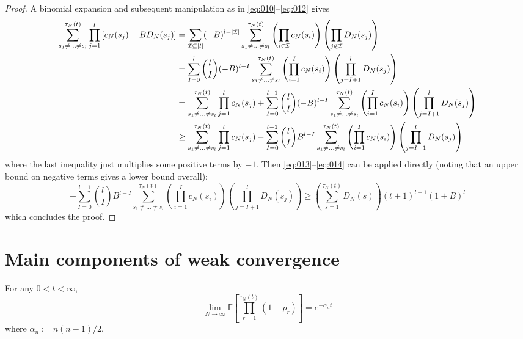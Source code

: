 \documentclass{article}
\newcommand{\E}{\mathbb{E}}
\newcommand{\1}[1]{\mathbbm{1}_{#1}}
\begin{document}
\begin{proof}
A binomial expansion and subsequent manipulation as in \eqref{eq:010}--\eqref{eq:012} gives
\begin{align}
\sum_{s_1\neq\dots\neq s_l}^{\tau_N(t)} \prod_{j=1}^l 
        \left[ c_N(s_j) - B D_N(s_j) \right]
&= \sum_{\mathcal{I} \subseteq [l]} (-B)^{l-|\mathcal{I}|}
        \sum_{s_1\neq\dots\neq s_l}^{\tau_N(t)}
        \left( \prod_{i\in\mathcal{I}} c_N(s_i) \right)
        \left( \prod_{j\notin\mathcal{I}} D_N(s_j) \right) \notag\\
&= \sum_{I=0}^l \binom{l}{I} (-B)^{l-I} 
        \sum_{s_1\neq\dots\neq s_l}^{\tau_N(t)}
        \left( \prod_{i=1}^I c_N(s_i) \right)
        \left( \prod_{j=I+1}^l D_N(s_j) \right) \notag\\
&= \sum_{s_1\neq\dots\neq s_l}^{\tau_N(t)} \prod_{j=1}^l c_N(s_j)
        + \sum_{I=0}^{l-1} \binom{l}{I} (-B)^{l-I} 
        \sum_{s_1\neq\dots\neq s_l}^{\tau_N(t)}
        \left( \prod_{i=1}^I c_N(s_i) \right) 
        \left( \prod_{j=I+1}^l D_N(s_j) \right) \notag\\
&\geq \sum_{s_1\neq\dots\neq s_l}^{\tau_N(t)} \prod_{j=1}^l c_N(s_j)
        - \sum_{I=0}^{l-1} \binom{l}{I} B^{l-I} 
        \sum_{s_1\neq\dots\neq s_l}^{\tau_N(t)}
        \left( \prod_{i=1}^I c_N(s_i) \right) \left( \prod_{j=I+1}^l D_N(s_j) \right)
\end{align}
where the last inequality just multiplies some positive terms by $-1$.
Then \eqref{eq:013}--\eqref{eq:014} can be applied directly (noting that an upper bound on negative terms gives a lower bound overall):
\begin{equation}
- \sum_{I=0}^{l-1} \binom{l}{I} B^{l-I} 
        \sum_{s_1\neq\dots\neq s_l}^{\tau_N(t)}
        \left( \prod_{i=1}^I c_N(s_i) \right) \left( \prod_{j=I+1}^l D_N(s_j) \right)
\geq \left( \sum_{s=1}^{\tau_N(t)} D_N(s) \right) (t+1)^{l-1} (1+B)^l 
\end{equation}
which concludes the proof.
\end{proof}


\section*{Main components of weak convergence}

\begin{lemma}\label{thm:basis}
For any $0 < t < \infty$,
\begin{equation}
\lim_{N\to\infty} \E\left[ \prod_{r=1}^{\tau_N(t)} (1-p_r) \right] 
= e^{-\alpha_n t}
\end{equation}
where $\alpha_n := n(n-1)/2$.
\end{lemma}
\end{document}
